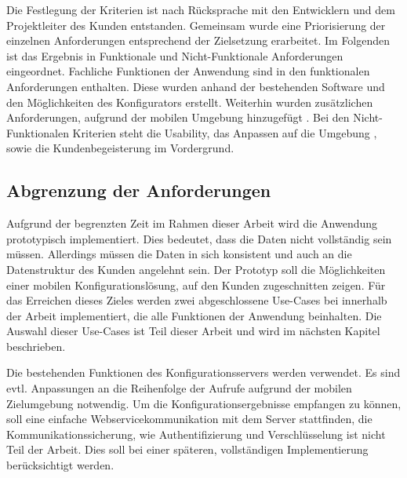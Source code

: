Die Festlegung der Kriterien ist nach Rücksprache mit den Entwicklern und dem Projektleiter des Kunden entstanden. Gemeinsam wurde eine Priorisierung der einzelnen Anforderungen entsprechend der Zielsetzung erarbeitet. Im Folgenden ist das Ergebnis in Funktionale und Nicht-Funktionale Anforderungen eingeordnet. Fachliche Funktionen der Anwendung sind in den funktionalen Anforderungen enthalten. Diese wurden anhand der bestehenden Software und den Möglichkeiten des Konfigurators erstellt. Weiterhin wurden zusätzlichen Anforderungen, aufgrund der mobilen Umgebung hinzugefügt . Bei den Nicht-Funktionalen Kriterien steht die Usability, das Anpassen auf die Umgebung , sowie die Kundenbegeisterung im Vordergrund. 

\subsection{Abgrenzung der Anforderungen}
Aufgrund der begrenzten Zeit im Rahmen dieser Arbeit wird die Anwendung prototypisch implementiert. Dies bedeutet, dass die Daten nicht vollständig sein müssen. Allerdings müssen die Daten in sich konsistent und auch an die Datenstruktur des Kunden angelehnt sein. Der Prototyp soll die Möglichkeiten einer mobilen Konfigurationslösung, auf den Kunden zugeschnitten zeigen. Für das Erreichen dieses Zieles werden zwei abgeschlossene Use-Cases bei innerhalb der Arbeit implementiert, die alle Funktionen der Anwendung beinhalten. Die Auswahl dieser Use-Cases ist Teil dieser Arbeit und wird im nächsten Kapitel beschrieben. \par

 Die bestehenden Funktionen des Konfigurationsservers werden verwendet. Es sind evtl. Anpassungen an die Reihenfolge der Aufrufe aufgrund der mobilen Zielumgebung notwendig. Um die Konfigurationsergebnisse empfangen zu können, soll eine einfache Webservicekommunikation mit dem Server stattfinden, die Kommunikationssicherung, wie Authentifizierung und Verschlüsselung ist nicht Teil der Arbeit. Dies soll bei einer späteren, vollständigen Implementierung berücksichtigt werden.

